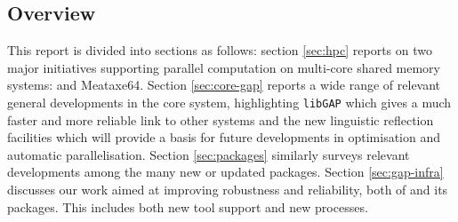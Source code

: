\subsection{Overview}
This report is divided into sections as follows: 
section \ref{sec:hpc} reports on two major initiatives supporting
parallel computation on multi-core shared memory
systems: \HPCGAP and Meataxe64. Section  \ref{sec:core-gap}
reports a wide range of relevant general developments in the core \GAP
system, highlighting \texttt{libGAP} which gives a much faster and
more reliable link to other systems and the new linguistic reflection
facilities which will provide a basis for future developments in
optimisation and automatic parallelisation. Section \ref{sec:packages}
similarly surveys relevant developments among the many new or updated packages.
Section \ref{sec:gap-infra} discusses our work aimed at improving
robustness and reliability, both of \GAP and its packages. This
includes both new tool support and new processes. 

